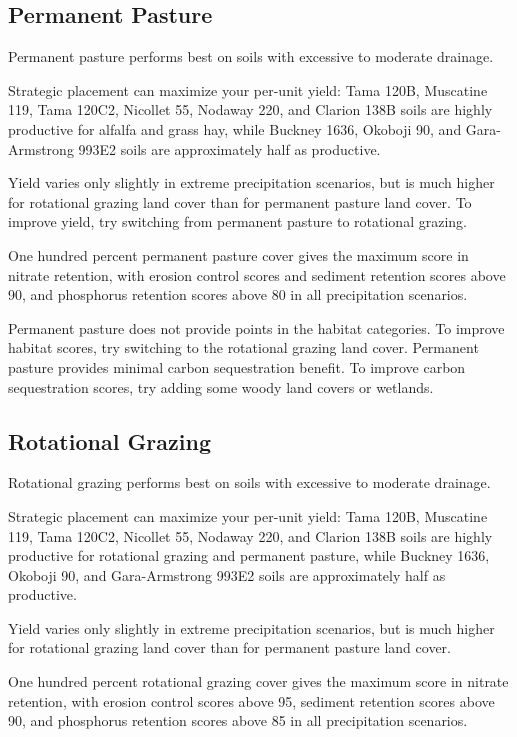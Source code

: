 \documentclass[11pt]{article}
\begin{document}
\subsection{Permanent Pasture}

Permanent pasture performs best on soils with excessive to moderate drainage.

Strategic placement can maximize your per-unit yield: Tama 120B, Muscatine 119, Tama 120C2, Nicollet 55, Nodaway 220, and Clarion 138B soils are highly productive for alfalfa and grass hay, while Buckney 1636, Okoboji 90, and Gara-Armstrong 993E2 soils are approximately half as productive.

Yield varies only slightly in extreme precipitation scenarios, but is much higher for rotational grazing land cover than for permanent pasture land cover. To improve yield, try switching from permanent pasture to rotational grazing.

One hundred percent permanent pasture cover gives the maximum score in nitrate retention, with erosion control scores and sediment retention scores above 90, and phosphorus retention scores above 80 in all precipitation scenarios.

Permanent pasture does not provide points in the habitat categories. To improve habitat scores, try switching to the rotational grazing land cover. Permanent pasture provides minimal carbon sequestration benefit.  To improve carbon sequestration scores, try adding some woody land covers or wetlands.

\subsection{Rotational Grazing}

Rotational grazing performs best on soils with excessive to moderate drainage.

Strategic placement can maximize your per-unit yield: Tama 120B, Muscatine 119, Tama 120C2, Nicollet 55, Nodaway 220, and Clarion 138B soils are highly productive for rotational grazing and permanent pasture, while Buckney 1636, Okoboji 90, and Gara-Armstrong 993E2 soils are approximately half as productive.

Yield varies only slightly in extreme precipitation scenarios, but is much higher for rotational grazing land cover than for permanent pasture land cover.

One hundred percent rotational grazing cover gives the maximum score in nitrate retention, with erosion control scores above 95, sediment retention scores above 90, and phosphorus retention scores above 85 in all precipitation scenarios.
\end{document}
